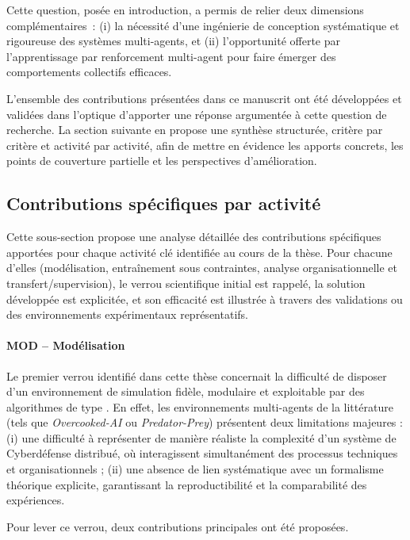 \noindent
Cette question, posée en introduction, a permis de relier deux dimensions complémentaires~:
(i) la nécessité d'une ingénierie de conception systématique et rigoureuse des systèmes multi-agents, et
(ii) l'opportunité offerte par l'apprentissage par renforcement multi-agent pour faire émerger des comportements collectifs efficaces.

L'ensemble des contributions présentées dans ce manuscrit ont été développées et validées dans l'optique d'apporter une réponse argumentée à cette question de recherche. La section suivante en propose une synthèse structurée, critère par critère et activité par activité, afin de mettre en évidence les apports concrets, les points de couverture partielle et les perspectives d'amélioration.


\subsection*{Contributions spécifiques par activité}

Cette sous-section propose une analyse détaillée des contributions spécifiques apportées pour chaque activité clé identifiée au cours de la thèse. Pour chacune d'elles (modélisation, entraînement sous contraintes, analyse organisationnelle et transfert/supervision), le verrou scientifique initial est rappelé, la solution développée est explicitée, et son efficacité est illustrée à travers des validations ou des environnements expérimentaux représentatifs.

\paragraph{MOD – Modélisation}

Le premier verrou identifié dans cette thèse concernait la difficulté de disposer d'un environnement de simulation fidèle, modulaire et exploitable par des algorithmes de type .
En effet, les environnements multi-agents de la littérature (tels que \textit{Overcooked-AI} ou \textit{Predator-Prey}) présentent deux limitations majeures :
(i) une difficulté à représenter de manière réaliste la complexité d'un système de Cyberdéfense distribué, où interagissent simultanément des processus techniques et organisationnels ;
(ii) une absence de lien systématique avec un formalisme théorique explicite, garantissant la reproductibilité et la comparabilité des expériences.

Pour lever ce verrou, deux contributions principales ont été proposées.

